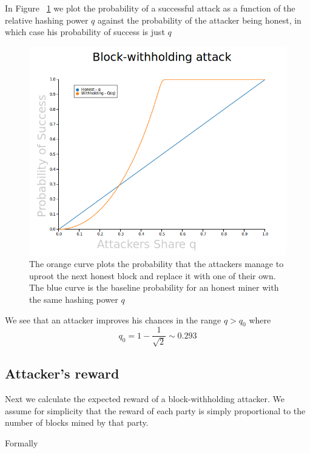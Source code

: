\documentclass[letterpaper,12pt]{report}
\theoremstyle{plain}
\theoremstyle{definition}
\begin{document}
In Figure ~\ref{fig:PlotProbOfSuccess} we plot the probability of a successful attack as a function of the relative hashing power $q$ against the probability of the attacker being honest, in which case his probability of success is just $q$

\begin{figure}[pos]
\centering
\includegraphics[width=150mm]{Blockwithholdingattack.png}
\caption{The orange curve plots the probability that the attackers manage to uproot the next honest block and replace it with one of their own. The blue curve is the baseline probability for an honest miner with the same hashing power $q$}
\label{fig:PlotProbOfSuccess}
\end{figure}

We see that an attacker improves his chances in the range $q>q_0$ where
\begin{equation}\label{qnot}
q_0=1-\frac{1}{\sqrt{2}} \sim 0.293
\end{equation}



\newpage

\subsection{Attacker's reward}
Next we calculate the expected reward of a block-withholding attacker.
We assume for simplicity that the reward of each party is simply proportional to the number of blocks mined by that party.

Formally
\end{document}
